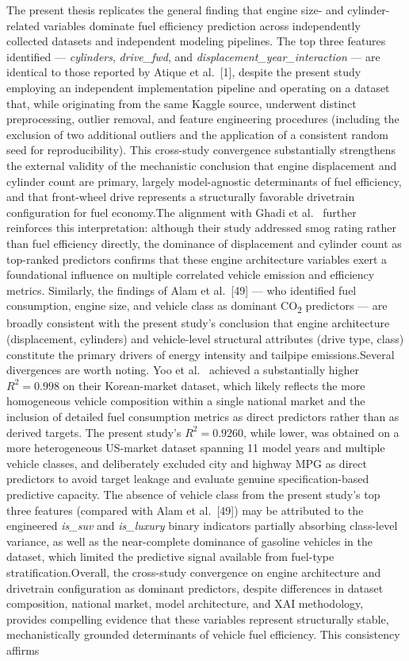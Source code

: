 The present thesis replicates the general finding that engine size- and cylinder-related variables dominate fuel efficiency prediction across independently collected datasets and independent modeling pipelines. The top three features identified --- \textit{cylinders}, \textit{drive\_fwd}, and \textit{displacement\_year\_interaction} --- are identical to those reported by Atique et al.~[1], despite the present study employing an independent implementation pipeline and operating on a dataset that, while originating from the same Kaggle source, underwent distinct preprocessing, outlier removal, and feature engineering procedures (including the exclusion of two additional outliers and the application of a consistent random seed for reproducibility). This cross-study convergence substantially strengthens the external validity of the mechanistic conclusion that engine displacement and cylinder count are primary, largely model-agnostic determinants of fuel efficiency, and that front-wheel drive represents a structurally favorable drivetrain configuration for fuel economy.The alignment with Ghadi et al.~\cite{ghadi2025explainable} further reinforces this interpretation: although their study addressed smog rating rather than fuel efficiency directly, the dominance of displacement and cylinder count as top-ranked predictors confirms that these engine architecture variables exert a foundational influence on multiple correlated vehicle emission and efficiency metrics. Similarly, the findings of Alam et al.~[49] --- who identified fuel consumption, engine size, and vehicle class as dominant CO\textsubscript{2} predictors --- are broadly consistent with the present study's conclusion that engine architecture (displacement, cylinders) and vehicle-level structural attributes (drive type, class) constitute the primary drivers of energy intensity and tailpipe emissions.Several divergences are worth noting. Yoo et al.~\cite{yoo2025machine} achieved a substantially higher \(R^2 = 0.998\) on their Korean-market dataset, which likely reflects the more homogeneous vehicle composition within a single national market and the inclusion of detailed fuel consumption metrics as direct predictors rather than as derived targets. The present study's \(R^2 = 0.9260\), while lower, was obtained on a more heterogeneous US-market dataset spanning 11 model years and multiple vehicle classes, and deliberately excluded city and highway MPG as direct predictors to avoid target leakage and evaluate genuine specification-based predictive capacity. The absence of vehicle class from the present study's top three features (compared with Alam et al.~[49]) may be attributed to the engineered \textit{is\_suv} and \textit{is\_luxury} binary indicators partially absorbing class-level variance, as well as the near-complete dominance of gasoline vehicles in the dataset, which limited the predictive signal available from fuel-type stratification.Overall, the cross-study convergence on engine architecture and drivetrain configuration as dominant predictors, despite differences in dataset composition, national market, model architecture, and XAI methodology, provides compelling evidence that these variables represent structurally stable, mechanistically grounded determinants of vehicle fuel efficiency. This consistency affirms 